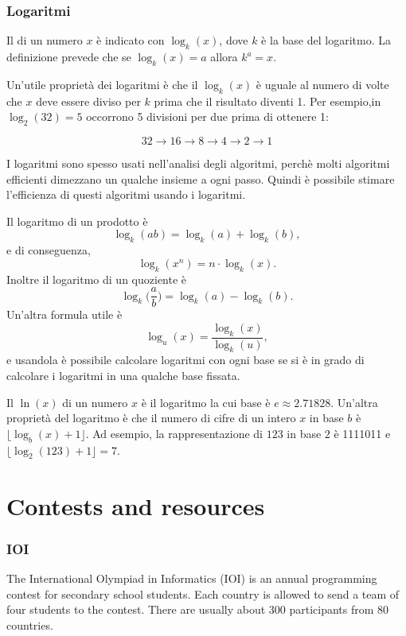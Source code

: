 \subsubsection{Logaritmi}


Il  di un numero $x$
è indicato con $\log_k(x)$, dove $k$ è la base
del logaritmo.
La definizione prevede che se
$\log_k(x)=a$ allora $k^a=x$.

Un'utile proprietà dei logaritmi
è che il $\log_k(x)$ è uguale al numero di volte
che $x$ deve essere diviso per $k$ prima che il risultato 
diventi 1.
Per esempio,in $\log_2(32)=5$
occorrono 5 divisioni per due prima di ottenere 1:

\[32 \rightarrow 16 \rightarrow 8 \rightarrow 4 \rightarrow 2 \rightarrow 1 \]

I logaritmi sono spesso usati nell'analisi
degli algoritmi, perchè molti algoritmi efficienti
dimezzano un qualche insieme a ogni passo.
Quindi è possibile stimare l'efficienza di questi algoritmi
usando i logaritmi.

Il logaritmo di un prodotto è
\[\log_k(ab) = \log_k(a)+\log_k(b),\]
e di conseguenza,
\[\log_k(x^n) = n \cdot \log_k(x).\]
Inoltre il logaritmo di un quoziente è
\[\log_k\Big(\frac{a}{b}\Big) = \log_k(a)-\log_k(b).\]
Un'altra formula utile è
\[\log_u(x) = \frac{\log_k(x)}{\log_k(u)},\]
e usandola è possibile calcolare
logaritmi con ogni base se si è in grado
di calcolare i logaritmi in una qualche base fissata.


Il  $\ln(x)$ di un numero $x$
è il logaritmo la cui base è $e \approx 2.71828$.
Un'altra proprietà del logaritmo è che il numero di cifre
di un intero $x$ in base $b$ è
$\lfloor \log_b(x)+1 \rfloor$.
Ad esempio, la rappresentazione di
$123$ in base $2$ è 1111011 e
$\lfloor \log_2(123)+1 \rfloor = 7$.

\section{Contests and resources}

\subsubsection{IOI}

The International Olympiad in Informatics (IOI)
is an annual programming contest for
secondary school students.
Each country is allowed to send a team of
four students to the contest.
There are usually about 300 participants
from 80 countries.

